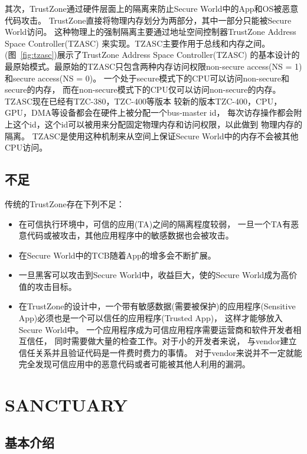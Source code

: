其次，TrustZone通过硬件层面上的隔离来防止Secure World中的App和OS被恶意代码攻击。
TrustZone直接将物理内存划分为两部分，其中一部分只能被Secure World访问。
这种物理上的强制隔离主要通过地址空间控制器TrustZone Address Space Controller(TZASC)
来实现。TZASC主要作用于总线和内存之间。
(图~\ref{fig:tzasc})展示了TrustZone Address Space Controller(TZASC)
的基本设计的最原始模式。最原始的TZASC只包含两种内存访问权限non-secure access(NS = 1)
和secure access(NS = 0)。
一个处于secure模式下的CPU可以访问non-secure和secure的内存，
而在non-secure模式下的CPU仅可以访问non-secure的内存。
TZASC现在已经有TZC-380，TZC-400等版本
较新的版本TZC-400，CPU，GPU，DMA等设备都会在硬件上被分配一个bus-master id，
每次访存操作都会附上这个id，这个id可以被用来分配固定物理内存和访问权限，以此做到
物理内存的隔离。
TZASC是使用这种机制来从空间上保证Secure World中的内存不会被其他CPU访问。



\subsection{不足}
传统的TrustZone存在下列不足：
\begin{itemize}
    \item
    在可信执行环境中，可信的应用(TA)之间的隔离程度较弱，
    一旦一个TA有恶意代码或被攻击，其他应用程序中的敏感数据也会被攻击。
    \item
    在Secure World中的TCB随着App的增多会不断扩展。
    \item 
    一旦黑客可以攻击到Secure World中，收益巨大，使的Secure World成为高价值的攻击目标。
    \item
    在TrustZone的设计中，一个带有敏感数据(需要被保护)的应用程序(Sensitive App)必须也是一个可以信任的应用程序(Trusted App)，
    这样才能够放入Secure World中。
    一个应用程序成为可信应用程序需要运营商和软件开发者相互信任，
    同时需要做大量的检查工作。对于小的开发者来说，
    与vendor建立信任关系并且验证代码是一件费时费力的事情。
    对于vendor来说并不一定就能完全发现可信应用中的恶意代码或者可能被其他人利用的漏洞。
\end{itemize}


\section{SANCTUARY}
\subsection{基本介绍}
